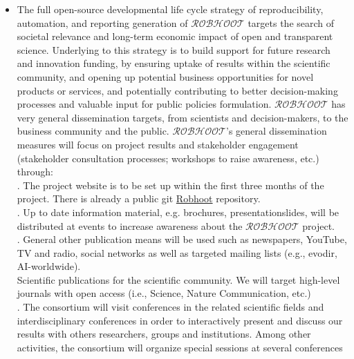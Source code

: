 \documentclass[11pt, a4paper]{article} %
\begin{document}
  \begin{itemize}
  \item The full open-source developmental life cycle strategy of
    reproducibility, automation, and reporting generation of
    $\mathcal{ROBHOOT}$ targets the search of societal relevance and
    long-term economic impact of open and transparent
    science. Underlying to this strategy is to build support for
    future research and innovation funding, by ensuring uptake of
    results within the scientific community, and opening up potential
    business opportunities for novel products or services, and
    potentially contributing to better decision-making processes and
    valuable input for public policies
    formulation. $\mathcal{ROBHOOT}$ has very general dissemination
    targets, from scientists and decision-makers, to the business
    community and the public. $\mathcal{ROBHOOT}$'s general
    dissemination measures will focus on project results and
    stakeholder engagement (stakeholder consultation processes;
    workshops to raise awareness, etc.) through:\\
    \hspace{0.15 in}. The project website is to be set up within the
    first three months of the project. There is already a public git
    \href{https://github.com/RobhooX/Robhoot}{Robhoot} repository.\\
    \hspace{0.15 in}. Up to date information material, e.g. brochures,
    presentationslides, will be distributed at events to increase awareness about the $\mathcal{ROBHOOT}$ project.\\
    \hspace{0.15 in}. General other publication means will be used
    such as newspapers, YouTube, TV and radio, social networks as well
    as
    targeted mailing lists (e.g., evodir, AI-worldwide).\\
    \hspace{0.15 in} Scientific publications for the scientific
    community. We will target high-level journals with open access (i.e., Science, Nature Communication, etc.)\\
    \hspace{0.15 in}. The consortium will visit conferences in the
    related scientific fields and interdisciplinary conferences in
    order to interactively present and discuss our results with others
    researchers, groups and institutions. Among other activities, the
    consortium will organize special sessions at several conferences

\end{itemize}
\end{document}
